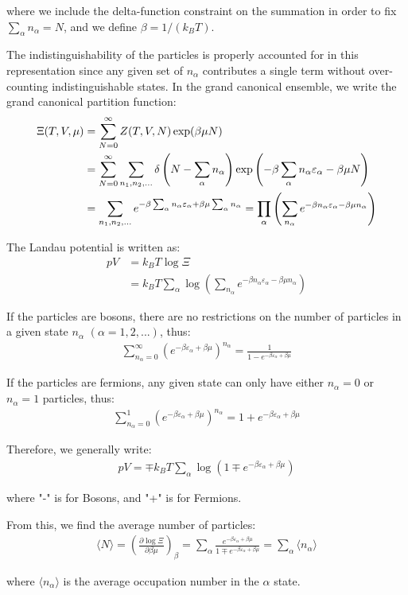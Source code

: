 \documentclass[book.tex]{subfiles}
\begin{document}
\noindent where we include the delta-function constraint on the summation in order to fix $\sum_\alpha n_\alpha=N$, and we define $\beta = 1/(k_BT)$.

The indistinguishability of the particles is properly accounted
for in this representation since any given set of $n_\alpha$ contributes a single term without over-counting indistinguishable states.
In the grand canonical ensemble, we write the grand canonical
partition function:
\begin{align}
\Xi(T,V,\mu) &=\sum_{N=0}^\infty Z(T,V,N) \exp(\beta \mu N) \notag\\
  &= \sum_{N=0}^\infty \sum_{n_1,n_2,...} \delta \left(N-\sum_\alpha n_\alpha\right) \exp \left(-\beta \sum_\alpha n_\alpha \varepsilon_\alpha -\beta \mu N\right) \notag\\
  &= \sum_{n_1,n_2,...} e^{-\beta \sum_\alpha n_\alpha \varepsilon_\alpha +\beta \mu \sum_\alpha n_\alpha} = \prod_\alpha \left(\sum_{n_\alpha} e^{-\beta n_\alpha \varepsilon_\alpha -\beta \mu n_\alpha} \right) \notag
\end{align}

The Landau potential is written as:
\begin{align}\label{Eq2}
pV &= k_BT \log \Xi \\
&= k_BT\sum_\alpha \log \left(\sum_{n_\alpha} e^{-\beta n_\alpha \varepsilon_\alpha -\beta \mu n_\alpha} \right)
\end{align}

If the particles are bosons, there are no restrictions on the number of particles in a given state $n_\alpha$ $(\alpha = 1,2,...)$, thus:
\begin{align}\label{Eq3}
\sum_{n_\alpha = 0}^\infty \left(e^{-\beta \varepsilon_\alpha + \beta \mu }\right)^{n_\alpha} = \frac{1}{1 - e^{-\beta \varepsilon_\alpha + \beta \mu }}
\end{align}

If the particles are fermions, any given state can only have either $n_\alpha = 0$ or $n_\alpha = 1$ particles, thus:
\begin{align}\label{Eq4}
\sum_{n_\alpha = 0}^1 \left(e^{-\beta \varepsilon_\alpha + \beta \mu }\right)^{n_\alpha} = 1 + e^{-\beta \varepsilon_\alpha + \beta \mu }
\end{align}

Therefore, we generally write:
\begin{align}\label{Eq5}
pV = \mp k_BT\sum_\alpha \log \left(1 \mp e^{-\beta \varepsilon_\alpha + \beta \mu} \right)
\end{align}

\noindent where "-" is for Bosons, and "+" is for Fermions.

From this, we find the average number of particles:
\begin{align}\label{Eq6}
\langle N \rangle = \left(\frac{\partial \log \Xi}{\partial \beta
\mu}\right)_{\beta} = \sum_\alpha \frac{e^{-\beta \varepsilon_\alpha + \beta \mu}}{1 \mp e^{-\beta \varepsilon_\alpha + \beta \mu}} = \sum_\alpha \langle n_\alpha \rangle
\end{align}

\noindent where $\langle n_\alpha \rangle$ is the average occupation number in the $\alpha$ state.
\end{document}
